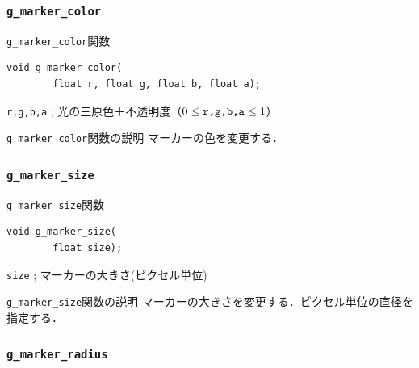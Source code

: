 \documentclass[platex,a4paper,12pt]{jsarticle}%
\begin{document}
\subsubsection{\texttt{g\_marker\_color}}

\begin{itembox}[l]{\texttt{g\_marker\_color}関数}
\begin{verbatim}
void g_marker_color(
        float r, float g, float b, float a);
\end{verbatim}
\verb|r,g,b,a| ; 光の三原色＋不透明度（$0\leq \verb|r,g,b,a| \leq 1$）\\
\end{itembox}

\begin{itembox}[l]{\texttt{g\_marker\_color}関数の説明}
マーカーの色を変更する．
\end{itembox}

\subsubsection{\texttt{g\_marker\_size}}

\begin{itembox}[l]{\texttt{g\_marker\_size}関数}
\begin{verbatim}
void g_marker_size(
        float size);
\end{verbatim}
\verb|size| ; マーカーの大きさ(ピクセル単位)\\
\end{itembox}

\begin{itembox}[l]{\texttt{g\_marker\_size}関数の説明}
	マーカーの大きさを変更する．ピクセル単位の直径を指定する．
\end{itembox}

\subsubsection{\texttt{g\_marker\_radius}}
\end{document}
